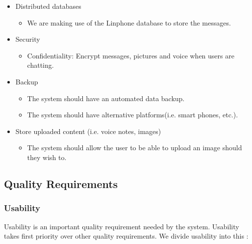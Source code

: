 \documentclass[a4paper]{article}
\begin{document}
\begin{itemize}	
		\item Distributed databases
			\begin{itemize}
				
				\item We are making use of the Linphone database to store the messages.
			\end{itemize}
\end{itemize}

\begin{itemize}	
		\item Security
			\begin{itemize}
				\item Confidentiality: Encrypt messages, pictures and voice when users are chatting.
			\end{itemize}
			
		\item Backup
		  \begin{itemize}
			  \item The system should have an automated data backup.
			  \item The system should have alternative platforms(i.e. smart phones, etc.).
		  \end{itemize}					
		  
		\item Store uploaded content (i.e. voice notes, images)
		  \begin{itemize}
			  \item The system should allow the user to be able to upload an image should they wish to.
		  \end{itemize}					
		
\end{itemize}

\subsection{Quality Requirements}
\subsubsection{Usability}
Usability is an important quality requirement needed by the system. Usability takes first priority over other quality requirements. We divide usability into this :\\
\end{document}
